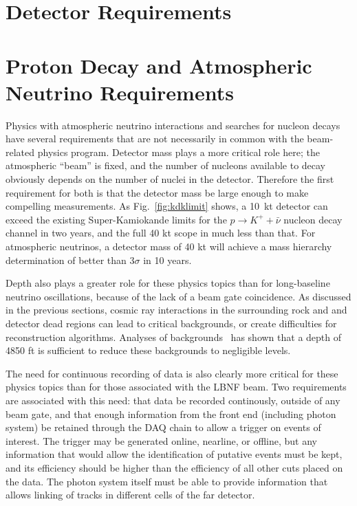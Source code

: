 \section{Detector Requirements}
\label{sec:physics-atmpdk-detector-requirements}
\section{Proton Decay and Atmospheric Neutrino Requirements}

Physics with atmospheric neutrino interactions and searches for nucleon decays
have several requirements that are not necessarily in common with the
beam-related physics program.  Detector mass plays a more critical role here;
the atmospheric ``beam'' is fixed, and the number of nucleons available to
decay obviously depends on the number of nuclei in the detector.  Therefore the
first requirement for both is that the detector mass be large enough to make
compelling measurements. As Fig.~\ref{fig:kdklimit} shows, a 10~kt detector can
exceed the existing Super-Kamiokande limits for the $p\rightarrow K^+ +
\bar{\nu}$ nucleon decay channel in two years, and the full 40 kt scope in much
less than that.  For atmospheric neutrinos, a detector mass of 40 kt will
achieve a mass hierarchy determination of better than 3$\sigma$ in 10 years.

Depth also plays a greater role for these physics topics than for long-baseline
neutrino oscillations, because of the lack of a beam gate coincidence. As
discussed in the previous sections, cosmic ray interactions in the surrounding
rock and and detector dead regions can lead to critical backgrounds, or create
difficulties for reconstruction algorithms. Analyses of
backgrounds~\cite{bueno, klinger, sciopp} has shown that a depth of 4850 ft is
sufficient to reduce these backgrounds to negligible levels.

The need for continuous recording of data is also clearly more critical for
these physics topics than for those associated with the LBNF beam.  Two
requirements are associated with this need: that data be recorded continously,
outside of any beam gate, and that enough information from the front end
(including photon system) be retained through the DAQ chain to allow a trigger
on events of interest. The trigger may be generated online, nearline, or
offline, but any information that would allow the identification of putative
events must be kept, and its efficiency should be higher than the efficiency of
all other cuts placed on the data.  The photon system itself must be able to
provide information that allows linking of tracks in different cells of the far
detector.

